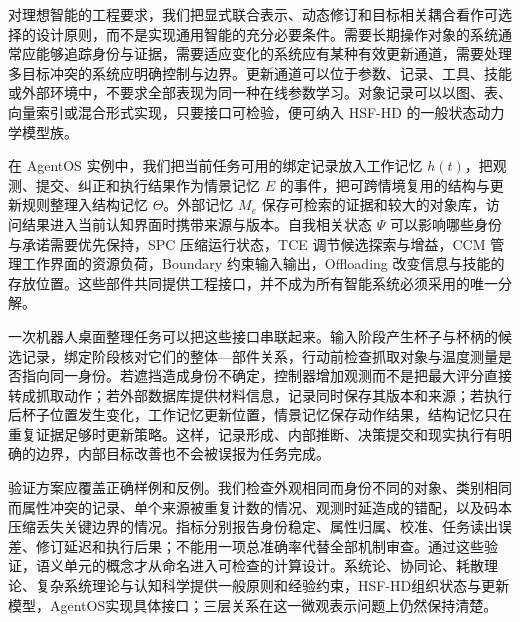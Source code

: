 对理想智能的工程要求，我们把显式联合表示、动态修订和目标相关耦合看作可选择的设计原则，而不是实现通用智能的充分必要条件。需要长期操作对象的系统通常应能够追踪身份与证据，需要适应变化的系统应有某种有效更新通道，需要处理多目标冲突的系统应明确控制与边界。更新通道可以位于参数、记录、工具、技能或外部环境中，不要求全部表现为同一种在线参数学习。对象记录可以以图、表、向量索引或混合形式实现，只要接口可检验，便可纳入 HSF-HD 的一般状态动力学模型族。

在 AgentOS 实例中，我们把当前任务可用的绑定记录放入工作记忆 $h(t)$，把观测、提交、纠正和执行结果作为情景记忆 $E$ 的事件，把可跨情境复用的结构与更新规则整理入结构记忆 $\Theta$。外部记忆 $M_e$ 保存可检索的证据和较大的对象库，访问结果进入当前认知界面时携带来源与版本。自我相关状态 $\Psi$ 可以影响哪些身份与承诺需要优先保持，SPC 压缩运行状态，TCE 调节候选探索与增益，CCM 管理工作界面的资源负荷，Boundary 约束输入输出，Offloading 改变信息与技能的存放位置。这些部件共同提供工程接口，并不成为所有智能系统必须采用的唯一分解。

一次机器人桌面整理任务可以把这些接口串联起来。输入阶段产生杯子与杯柄的候选记录，绑定阶段核对它们的整体—部件关系，行动前检查抓取对象与温度测量是否指向同一身份。若遮挡造成身份不确定，控制器增加观测而不是把最大评分直接转成抓取动作；若外部数据库提供材料信息，记录同时保存其版本和来源；若执行后杯子位置发生变化，工作记忆更新位置，情景记忆保存动作结果，结构记忆只在重复证据足够时更新策略。这样，记录形成、内部推断、决策提交和现实执行有明确的边界，内部目标改善也不会被误报为任务完成。

验证方案应覆盖正确样例和反例。我们检查外观相同而身份不同的对象、类别相同而属性冲突的记录、单个来源被重复计数的情况、观测时延造成的错配，以及码本压缩丢失关键边界的情况。指标分别报告身份稳定、属性归属、校准、任务读出误差、修订延迟和执行后果；不能用一项总准确率代替全部机制审查。通过这些验证，语义单元的概念才从命名进入可检查的计算设计。系统论、协同论、耗散理论、复杂系统理论与认知科学提供一般原则和经验约束，HSF-HD组织状态与更新模型，AgentOS实现具体接口；三层关系在这一微观表示问题上仍然保持清楚。
